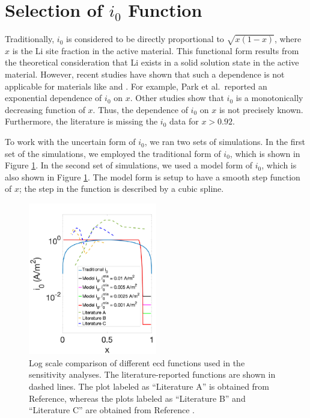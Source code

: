 \documentclass{article}
\begin{document}
\section{Selection of $i_0$ Function}

Traditionally, $i_0$ is considered to be directly proportional to
$\sqrt{x\left(1-x\right)}$, where $x$ is the Li site fraction in the
active
material\cite{newman1993,newman1994-2,newman1995-2,newman1996}. This
functional form results from the theoretical consideration that Li
exists in a solid solution state in the active material. However,
recent studies have shown that such a dependence is not applicable for
materials like \nca{}\cite{chueh2021} and \nmc{}\cite{mukherjee2017,chiang2020,tsai2018}. For
example, Park et al.\cite{chueh2021}\ reported an exponential
dependence of $i_0$ on $x$\cite{chueh2021}. Other studies show that
$i_0$ is a monotonically decreasing function of
$x$\cite{mukherjee2017,chiang2020,tsai2018}. Thus, the dependence of $i_0$ on $x$ is not
precisely known. Furthermore, the literature is missing the $i_0$ data
for $x>0.92$.

To work with the uncertain form of $i_0$, we ran two sets of
simulations. In the first set of the simulations, we employed the
traditional form of $i_0$, which is shown in Figure \ref{fig:i0_profiles}. In
the second set of simulations, we used a model form of $i_0$, which is
also shown in Figure \ref{fig:i0_profiles}. The model form is setup to have a
smooth step function of $x$; the step in the function is described by
a cubic spline.

\begin{figure}
  \includegraphics[width=0.5\textwidth]{i0_sensitivity.pdf}
  \caption{Log scale comparison of different \gls{ecd} functions used
    in the sensitivity analyses. The literature-reported functions are
    shown in dashed lines.  The plot labeled as ``Literature A'' is
    obtained from Reference\cite{dees2008}, whereas the plots labeled
    as ``Literature B'' and ``Literature C'' are obtained from
    Reference \cite{tsai2018}.}
  \label{fig:i0_profiles}
\end{figure}
\end{document}
